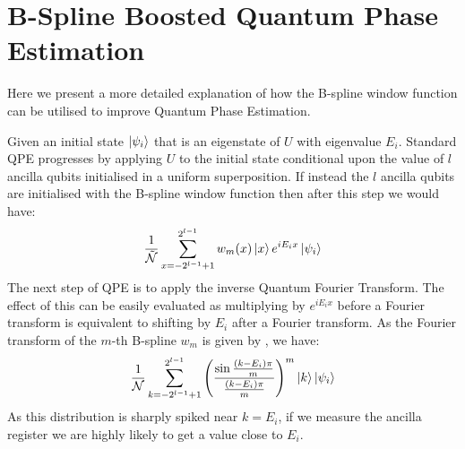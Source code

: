 \documentclass[a4paper,twocolumn,,accepted=2025-05-27]{quantumarticle}
\theoremstyle{empty}
\begin{document}
\section{B-Spline Boosted Quantum Phase Estimation}
\label{section:appendix_a}
Here we present a more detailed explanation of how the B-spline window function can be utilised to improve Quantum Phase Estimation.

Given an initial state $\ket{\psi_i}$ that is an eigenstate of $U$ with eigenvalue $E_i$. Standard QPE progresses by applying $U$ to the initial state conditional upon the value of $l$ ancilla qubits initialised in a uniform superposition. If instead the $l$ ancilla qubits are initialised with the B-spline window function then after this step we would have:
\begin{equation}
    \frac{1}{\tilde{\mathcal{N}}}\sum_{x=-2^{l-1}+1}^{2^{l-1}} w_{m}(x) \ket{x} e^{iE_i x} \ket{\psi_i}
\end{equation}
The next step of QPE is to apply the inverse Quantum Fourier Transform. The effect of this can be easily evaluated as multiplying by $e^{iE_ix}$ before a Fourier transform is equivalent to shifting by $E_i$ after a Fourier transform. As the Fourier transform of the $m$-th B-spline $w_m$ is given by \cite{bspline}, we have:
\begin{equation}
\label{eq:ftb-spline}
        \frac{1}{\mathcal{N}} \sum_{k=-2^{l-1}+1}^{2^{l-1}} \left(\frac{\sin \frac{(k-E_i)\pi}{m}}{ \frac{(k-E_i)\pi}{m}}\right)^m \ket{k}\ket{\psi_i}
\end{equation}
As this distribution is sharply spiked near $k=E_i$, if we measure the ancilla register we are highly likely to get a value close to $E_i$.
\end{document}
